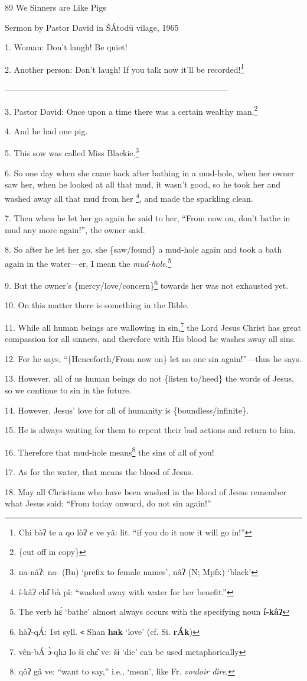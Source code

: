 
89 We Sinners are Like Pigs

Sermon by Pastor David in ŠÁtodū vilage, 1965

1. Woman: Don't laugh! Be quiet!

2. Another person: Don't laugh! If you talk now it'll be recorded!\footnote{Chi bə̀ʔ te a qo lòʔ e ve yâ: lit. ``if you do it now it will go in!''}

---------------------------------------------------------------------------------

3. Pastor David: Once upon a time there was a certain wealthy man.\footnote{\{cut off in copy\}}

4. And he had one pig.

5. This sow was called Miss Blackie.\footnote{na-nâʔ: na- (Bn) `prefix to female names', nâʔ (N; Mpfx) `black'}

6. So one day when she came back after bathing in a mud-hole, when her owner saw
her, when he looked at all that mud, it wasn't good, so he took her and washed
away all that mud from her \footnote{í-kâʔ chɨ̂ bà pî: ``washed away with water for her benefit.''}, and made the sparkling clean.

7. Then when he let her go again he said to her, ``From now on, don't bathe in
mud any more again!'', the owner said.

8. So after he let her go, she \{saw/found\} a mud-hole again and took a bath again
in the water---er, I mean the \textit{mud-hole}.\footnote{The verb hɛ́ `bathe' almost always occurs with the specifying noun \textbf{í-kâʔ}}

9. But the owner's \{mercy/love/concern\}\footnote{hàʔ-qÁ: 1st syll. \texttt{<} Shan \textbf{hak} `love' (cf. Si. \textbf{rÁk})} towards her was not exhausted yet.

10. On this matter there is something in the Bible.

11. While all human beings are wallowing in sin,\footnote{vên-bÁ ɔ̀-qhɔ lo šɨ chɛ̂ ve: šɨ `die' can be used metaphorically} the Lord Jesus Christ has great
compassion for all sinners, and therefore with His blood he washes away all sins.

12. For he says, ``\{Henceforth/From now on\} let no one sin again!''---thus he
says.

13. However, all of us human beings do not \{listen to/heed\} the words of Jesus,
so we continue to sin in the future.

14. However, Jesus' love for all of humanity is \{boundless/infinite\}.

15. He is always waiting for them to repent their bad actions and return to him.

16. Therefore that mud-hole means\footnote{qôʔ gâ ve: ``want to say,'' i.e., `mean', like Fr. \textit{vouloir dire},} the sins of all of you!

17. As for the water, that means the blood of Jesus.

18. May all Christians who have been washed in the blood of Jesus remember what
Jesus said: ``From today onward, do not sin again!''

